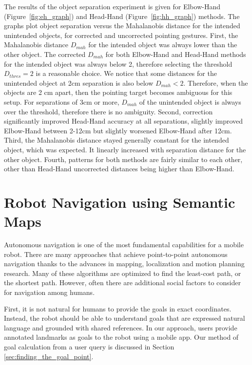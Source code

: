 \documentclass{tADR2e}
\begin{document}
The results of the object separation experiment is given for Elbow-Hand (Figure~\ref{fig:eh_graph}) and Head-Hand (Figure~\ref{fig:hh_graph}) methods. The graphs plot object separation versus the Mahalanobis distance for the intended unintended objects, for corrected and uncorrected pointing gestures. First, the Mahalanobis distance $D_{mah}$ for the intended object was always lower than the other object. The corrected $D_{mah}$ for both Elbow-Hand and Head-Hand methods for the intended object was always below 2, therefore selecting the threshold $D_{thres}=2$ is a reasonable choice. We notice that some distances for the unintended object at 2cm separation is also below $D_{mah}<2$. Therefore, when the objects are 2 cm apart, then the pointing target becomes ambiguous for this setup. For separations of 3cm or more, $D_{mah}$ of the unintended object is always over the threshold, therefore there is no ambiguity. Second, correction significantly improved Head-Hand accuracy at all separations, slightly improved Elbow-Hand between 2-12cm but slightly worsened Elbow-Hand after 12cm. Third, the Mahalanobis distance stayed generally constant for the intended object, which was expected. It linearly increased with separation distance for the other object. Fourth, patterns for both methods are fairly similar to each other, other than Head-Hand uncorrected distances being higher than Elbow-Hand.


\section{Robot Navigation using Semantic Maps}
\label{sec:robot_navigation}


Autonomous navigation is one of the most fundamental capabilities for a mobile robot. There are many approaches that achieve point-to-point autonomous navigation thanks to the advances in mapping, localization and motion planning research. Many of these algorithms are optimized to find the least-cost path, or the shortest path. However, often there are additional social factors to consider for navigation among humans. 

First, it is not natural for humans to provide the goals in exact coordinates. Instead, the robot should be able to understand goals that are expressed natural language and grounded with shared references. In our approach, users provide annotated landmarks as goals to the robot using a mobile app. Our method of goal calculation from a user query is discussed in Section \ref{sec:finding_the_goal_point}.
\end{document}

